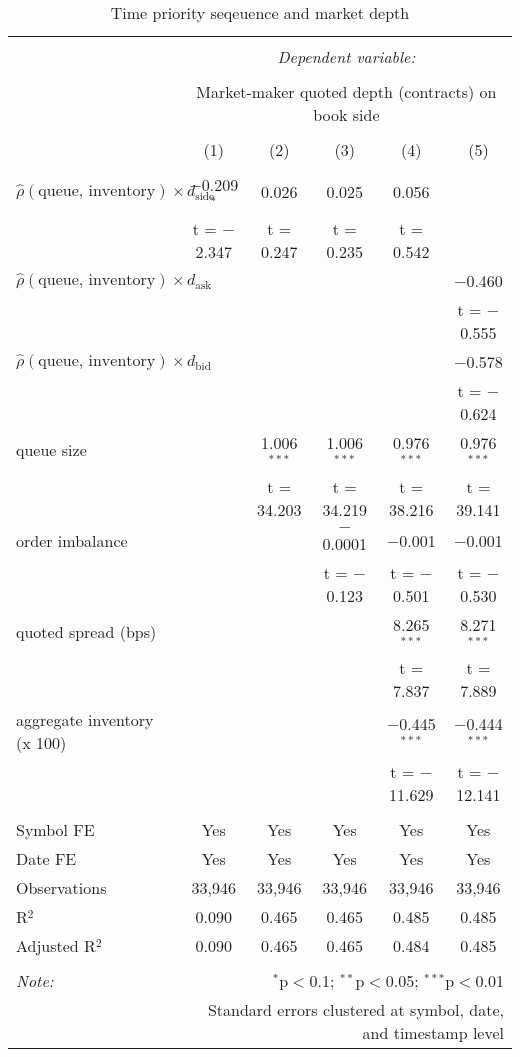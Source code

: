 
\begin{table}[!htbp] \centering 
  \caption{Time priority seqeuence and market depth} 
  \label{} 
\begin{tabular}{@{\extracolsep{5pt}}lccccc} 
\\[-1.8ex]\hline 
\hline \\[-1.8ex] 
 & \multicolumn{5}{c}{\textit{Dependent variable:}} \\ 
\cline{2-6} 
\\[-1.8ex] & \multicolumn{5}{c}{Market-maker quoted depth (contracts) on book side} \\ 
\\[-1.8ex] & (1) & (2) & (3) & (4) & (5)\\ 
\hline \\[-1.8ex] 
 $\hat{\rho}(\text{queue, inventory}) \times d_{\text{side}}$ & $-$0.209$^{*}$ & 0.026 & 0.025 & 0.056 &  \\ 
  & t = $-$2.347 & t = 0.247 & t = 0.235 & t = 0.542 &  \\ 
  $\hat{\rho}(\text{queue, inventory}) \times d_{\text{ask}}$ &  &  &  &  & $-$0.460 \\ 
  &  &  &  &  & t = $-$0.555 \\ 
  $\hat{\rho}(\text{queue, inventory}) \times d_{\text{bid}}$ &  &  &  &  & $-$0.578 \\ 
  &  &  &  &  & t = $-$0.624 \\ 
  queue size &  & 1.006$^{***}$ & 1.006$^{***}$ & 0.976$^{***}$ & 0.976$^{***}$ \\ 
  &  & t = 34.203 & t = 34.219 & t = 38.216 & t = 39.141 \\ 
  order imbalance &  &  & $-$0.0001 & $-$0.001 & $-$0.001 \\ 
  &  &  & t = $-$0.123 & t = $-$0.501 & t = $-$0.530 \\ 
  quoted spread (bps) &  &  &  & 8.265$^{***}$ & 8.271$^{***}$ \\ 
  &  &  &  & t = 7.837 & t = 7.889 \\ 
  aggregate inventory (x 100) &  &  &  & $-$0.445$^{***}$ & $-$0.444$^{***}$ \\ 
  &  &  &  & t = $-$11.629 & t = $-$12.141 \\ 
 \hline \\[-1.8ex] 
Symbol FE & Yes & Yes & Yes & Yes & Yes \\ 
Date FE & Yes & Yes & Yes & Yes & Yes \\ 
Observations & 33,946 & 33,946 & 33,946 & 33,946 & 33,946 \\ 
R$^{2}$ & 0.090 & 0.465 & 0.465 & 0.485 & 0.485 \\ 
Adjusted R$^{2}$ & 0.090 & 0.465 & 0.465 & 0.484 & 0.485 \\ 
\hline 
\hline \\[-1.8ex] 
\textit{Note:}  & \multicolumn{5}{r}{$^{*}$p$<$0.1; $^{**}$p$<$0.05; $^{***}$p$<$0.01} \\ 
 & \multicolumn{5}{r}{Standard errors clustered at symbol, date, and timestamp level} \\ 
\end{tabular} 
\end{table} 
